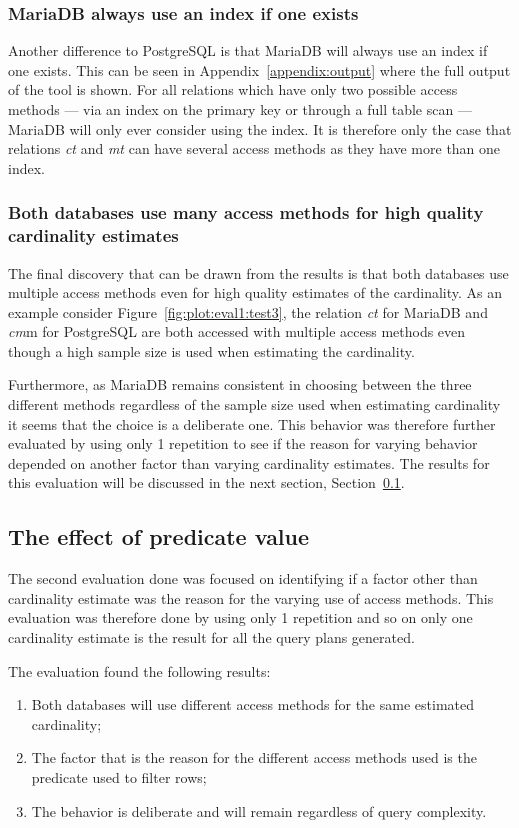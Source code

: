 \subsubsection{MariaDB always use an index if one exists}
Another difference to PostgreSQL is that MariaDB will always use an index if one
exists. This can be seen in Appendix~\ref{appendix:output} where the full output
of the tool is shown. For all relations which have only two possible access
methods --- via an index on the primary key or through a full table scan ---
MariaDB will only ever consider using the index. It is therefore only the case
that relations \textit{ct} and \textit{mt} can have several access methods as
they have more than one index.

\subsubsection{Both databases use many access methods for high quality
  cardinality estimates}
The final discovery that can be drawn from the results is that both databases
use multiple access methods even for high quality estimates of the cardinality.
As an example consider Figure~\ref{fig:plot:eval1:test3}, the relation
\textit{ct} for MariaDB and \textit{cm}m for PostgreSQL are both accessed with
multiple access methods even though a high sample size is used when estimating
the cardinality.

Furthermore, as MariaDB remains consistent in choosing between the three
different methods regardless of the sample size used when estimating cardinality
it seems that the choice is a deliberate one. This behavior was therefore
further evaluated by using only 1 repetition to see if the reason for varying
behavior depended on another factor than varying cardinality estimates. The
results for this evaluation will be discussed in the next section,
Section~\ref{sec:predicatecorrelation}.

\subsection{The effect of predicate value}\label{sec:predicatecorrelation}
The second evaluation done was focused on identifying if a factor other than
cardinality estimate was the reason for the varying use of access methods. This
evaluation was therefore done by using only 1 repetition and so on only one
cardinality estimate is the result for all the query plans generated.

The evaluation found the following results:
\begin{enumerate}
\item Both databases will use different access methods for the same estimated
  cardinality;
\item The factor that is the reason for the different access methods used is the
  predicate used to filter rows;
\item The behavior is deliberate and will remain regardless of query complexity.
\end{enumerate}

